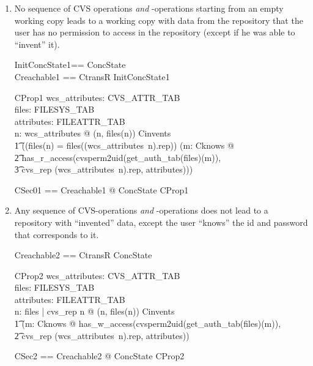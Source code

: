 \begin{enumerate}
\item No sequence of CVS operations \emph{and} \unix-operations starting from an
  empty working copy leads to a working copy with data from the repository that
  the user has no permission to access in the repository (except if he was able
  to ``invent'' it).
  \begin{zed}
    InitConcState1== ConcState \land [ wcs\_attributes: CVS\_ATTR\_TAB | \\
    \t1 wcs\_attributes = \emptyset ] \\ 
    Creachable1 == CtransR \limg InitConcState1 \rimg \\
  \end{zed}
  \begin{schema}{CProp1}
    wcs\_attributes: CVS\_ATTR\_TAB \\
    files: FILESYS\_TAB \\
    attributes: FILEATTR\_TAB \\
    \where
    \forall n: \dom wcs\_attributes @ (n, files(n)) \in Cinvents \lor \\
    \t1 ((files(n) = files((wcs\_attributes~n).rep)) \land (\exists m: Cknows @ \\
    \t2 has\_r\_access(cvsperm2uid(get\_auth\_tab(files)(m)), \\
    \t3 cvs\_rep \cat (wcs\_attributes~n).rep, attributes))) \\
  \end{schema}
  \begin{zed}
    CSec01 == \forall Creachable1 @  ConcState \land CProp1 \\
  \end{zed}
  
\item Any sequence of CVS-operations \emph{and} \unix-operations does not lead
  to a repository with ``invented'' data, except the user ``knows'' the id and
  password that corresponds to it.

  \begin{zed}
    Creachable2 == CtransR \limg ConcState \rimg \\
  \end{zed}
  \begin{schema}{CProp2}
    wcs\_attributes: CVS\_ATTR\_TAB \\
    files: FILESYS\_TAB \\
    attributes: FILEATTR\_TAB \\
    \where
    \forall n: \dom files | cvs\_rep \prefix n @ (n, files(n)) \in Cinvents
    \implies \\
    \t1 (\exists m: Cknows @
    has\_w\_access(cvsperm2uid(get\_auth\_tab(files)(m)), \\ 
    \t2 cvs\_rep \cat (wcs\_attributes~n).rep, attributes)) \\
  \end{schema}
  \begin{zed}
    CSec2 == \forall Creachable2 @  ConcState \land CProp2 \\
  \end{zed}
  

\end{enumerate}
